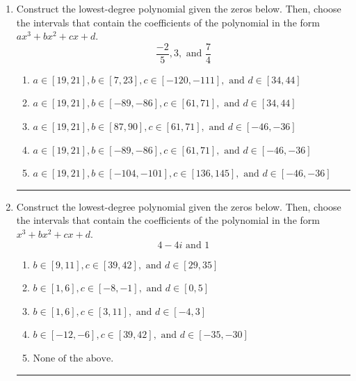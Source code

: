 \documentclass[14pt]{extbook}
\newcommand{\litem}[1]{\item#1\hspace*{-1cm}\rule{\textwidth}{0.4pt}}
\begin{document}
\begin{enumerate}
\litem{
Construct the lowest-degree polynomial given the zeros below. Then, choose the intervals that contain the coefficients of the polynomial in the form $ax^3+bx^2+cx+d$.\[ \frac{-2}{5}, 3, \text{ and } \frac{7}{4} \]\begin{enumerate}[label=\Alph*.]
\item \( a \in [19, 21], b \in [7, 23], c \in [-120, -111], \text{ and } d \in [34, 44] \)
\item \( a \in [19, 21], b \in [-89, -86], c \in [61, 71], \text{ and } d \in [34, 44] \)
\item \( a \in [19, 21], b \in [87, 90], c \in [61, 71], \text{ and } d \in [-46, -36] \)
\item \( a \in [19, 21], b \in [-89, -86], c \in [61, 71], \text{ and } d \in [-46, -36] \)
\item \( a \in [19, 21], b \in [-104, -101], c \in [136, 145], \text{ and } d \in [-46, -36] \)

\end{enumerate} }
\litem{
Construct the lowest-degree polynomial given the zeros below. Then, choose the intervals that contain the coefficients of the polynomial in the form $x^3+bx^2+cx+d$.\[ 4 - 4 i \text{ and } 1 \]\begin{enumerate}[label=\Alph*.]
\item \( b \in [9, 11], c \in [39, 42], \text{ and } d \in [29, 35] \)
\item \( b \in [1, 6], c \in [-8, -1], \text{ and } d \in [0, 5] \)
\item \( b \in [1, 6], c \in [3, 11], \text{ and } d \in [-4, 3] \)
\item \( b \in [-12, -6], c \in [39, 42], \text{ and } d \in [-35, -30] \)
\item \( \text{None of the above.} \)


\end{enumerate}}
\end{enumerate}
\end{document}
